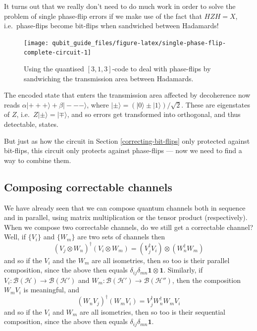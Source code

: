 \documentclass[fleqn,a4paper]{article}
\theoremstyle{definition}
\theoremstyle{definition}
\theoremstyle{definition}
\theoremstyle{definition}
\theoremstyle{remark}
\begin{document}
It turns out that we really don't need to do much work in order to solve the problem of single phase-flip errors if we make use of the fact that \(HZH=X\), i.e.~phase-flips become bit-flips when sandwiched between Hadamards!



\begin{figure}[H]

{\centering \texttt{[image: qubit\_guide\_files/figure-latex/single-phase-flip-complete-circuit-1]} 

}

\caption{Using the quantised \([3,1,3]\)-code to deal with phase-flips by sandwiching the transmission area between Hadamards.}\label{fig:single-phase-flip-complete-circuit}
\end{figure}

The encoded state that enters the transmission area affected by decoherence now reads \(\alpha|+++\rangle+\beta|---\rangle\), where \(|\pm\rangle=(|0\rangle\pm|1\rangle)/\sqrt{2}\).
These are eigenstates of \(Z\), i.e.~\(Z|\pm\rangle=|\mp\rangle\), and so errors get transformed into orthogonal, and thus detectable, states.

But just as how the circuit in Section \ref{correcting-bit-flips} only protected against bit-flips, this circuit only protects against phase-flips --- now we need to find a way to combine them.

\hypertarget{composing-correctable-channels}{%
\subsection{Composing correctable channels}\label{composing-correctable-channels}}

We have already seen that we can compose quantum channels both in sequence and in parallel, using matrix multiplication or the tensor product (respectively).
When we compose two correctable channels, do we still get a correctable channel?
Well, if \(\{V_i\}\) and \(\{W_m\}\) are two sets of channels then
\[
  (V_j\otimes W_n)^\dagger(V_i\otimes W_m)
  = (V_j^\dagger V_i)\otimes(W_n^\dagger W_m)
\]
and so if the \(V_i\) and the \(W_m\) are all isometries, then so too is their parallel composition, since the above then equals \(\delta_{ij}\delta_{mn}\mathbf{1}\otimes\mathbf{1}\).
Similarly, if \(V_i\colon\mathcal{B}(\mathcal{H})\to\mathcal{B}(\mathcal{H}')\) and \(W_m\colon\mathcal{B}(\mathcal{H}')\to\mathcal{B}(\mathcal{H}'')\), then the composition \(W_mV_i\) is meaningful, and
\[
  (W_nV_j)^\dagger(W_mV_i)
  = V_j^\dagger W_n^\dagger W_m V_i
\]
and so if the \(V_i\) and \(W_m\) are all isometries, then so too is their sequential composition, since the above then equals \(\delta_{ij}\delta_{mn}\mathbf{1}\).
\end{document}
